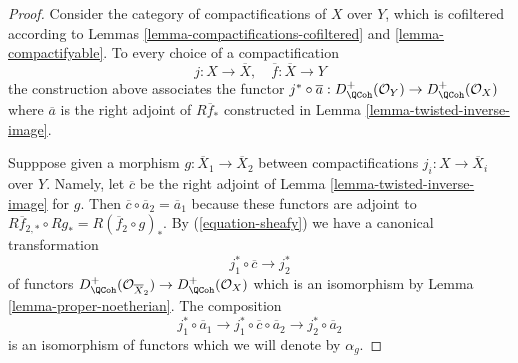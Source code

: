 \begin{proof}
Consider the category of compactifications of $X$ over $Y$,
which is cofiltered according to
Lemmas \ref{lemma-compactifications-cofiltered} and \ref{lemma-compactifyable}.
To every choice of a compactification
$$
j : X \to \overline{X},\quad \overline{f} : \overline{X} \to Y
$$
the construction above associates the functor $j^* \circ \overline{a} :
D_\QCoh^+(\mathcal{O}_Y) \to D_\QCoh^+(\mathcal{O}_X)$
where $\overline{a}$ is the right adjoint of $R\overline{f}_*$
constructed in Lemma \ref{lemma-twisted-inverse-image}.

\medskip\noindent
Supppose given a morphism $g : \overline{X}_1 \to \overline{X}_2$
between compactifications $j_i : X \to \overline{X}_i$ over $Y$.
Namely, let $\overline{c}$ be the right adjoint of
Lemma \ref{lemma-twisted-inverse-image} for $g$.
Then $\overline{c} \circ \overline{a}_2 = \overline{a}_1$
because these functors are adjoint to
$R\overline{f}_{2, *} \circ Rg_* = R(\overline{f}_2 \circ g)_*$.
By (\ref{equation-sheafy}) we have a canonical transformation
$$
j_1^* \circ \overline{c} \longrightarrow j_2^*
$$
of functors
$D^+_\QCoh(\mathcal{O}_{\overline{X}_2}) \to D^+_\QCoh(\mathcal{O}_X)$
which is an isomorphism by Lemma \ref{lemma-proper-noetherian}.
The composition
$$
j_1^* \circ \overline{a}_1 \longrightarrow
j_1^* \circ \overline{c} \circ \overline{a}_2 \longrightarrow
j_2^* \circ \overline{a}_2
$$
is an isomorphism of functors which we will denote by $\alpha_g$.


\end{proof}
